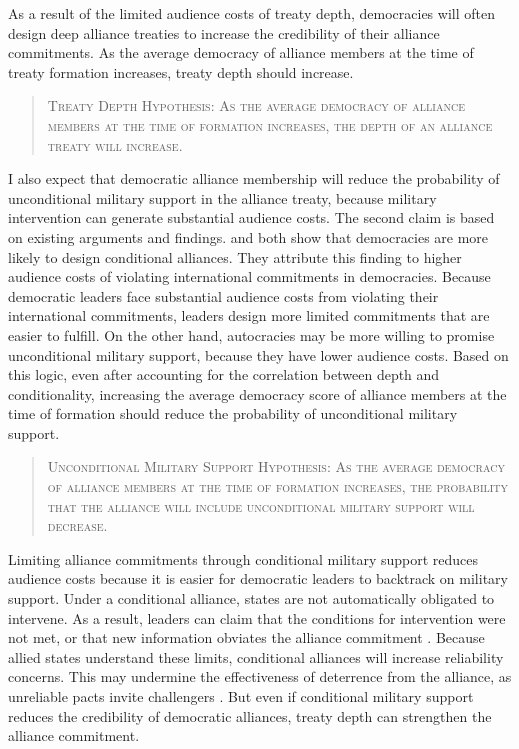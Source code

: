 \documentclass[12pt]{article}
\begin{document}
As a result of the limited audience costs of treaty depth, democracies will often design deep alliance treaties to increase the credibility of their alliance commitments. 
As the average democracy of alliance members at the time of treaty formation increases, treaty depth should increase. 


\begin{quote}
\textsc{Treaty Depth Hypothesis: As the average democracy of alliance members at the time of formation increases, the depth of an alliance treaty will increase.}
\end{quote} 


I also expect that democratic alliance membership will reduce the probability of unconditional military support in the alliance treaty, because military intervention can generate substantial audience costs. 
The second claim is based on existing arguments and findings. 
\citet{Mattes2012} and \citet{Chibaetal2015} both show that democracies are more likely to design conditional alliances. 
They attribute this finding to higher audience costs of violating international commitments in democracies. 
Because democratic leaders face substantial audience costs from violating their international commitments, leaders design more limited commitments that are easier to fulfill. 
On the other hand, autocracies may be more willing to promise unconditional military support, because they have lower audience costs. 
Based on this logic, even after accounting for the correlation between depth and conditionality, increasing the average democracy score of alliance members at the time of formation should reduce the probability of unconditional military support.


\begin{quote}
\textsc{Unconditional Military Support Hypothesis: As the average democracy of alliance members at the time of formation increases, the probability that the alliance will include unconditional military support will decrease.}
\end{quote} 


Limiting alliance commitments through conditional military support reduces audience costs because it is easier for democratic leaders to backtrack on military support. 
Under a conditional alliance, states are not automatically obligated to intervene. 
As a result, leaders can claim that the conditions for intervention were not met, or that new information obviates the alliance commitment \citep{LevenduskyHorowitz2012}. 
Because allied states understand these limits, conditional alliances will increase reliability concerns. 
This may undermine the effectiveness of deterrence from the alliance, as unreliable pacts invite challengers \citep{Smith1995}. 
But even if conditional military support reduces the credibility of democratic alliances, treaty depth can strengthen the alliance commitment. 
\end{document}

